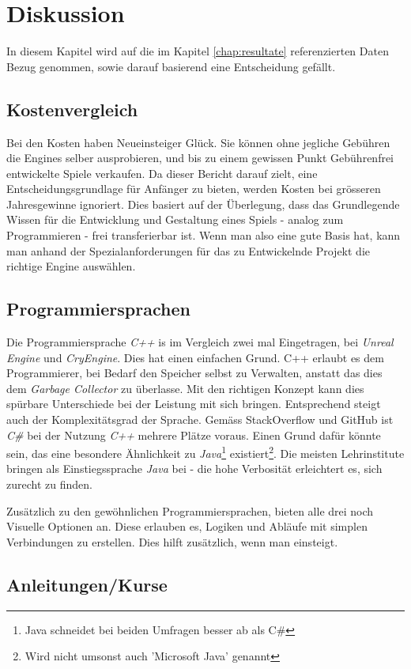 \chapter{Diskussion}

In diesem Kapitel wird auf die im Kapitel \ref{chap:resultate} referenzierten Daten Bezug genommen, sowie darauf basierend eine Entscheidung gefällt.

\section{Kostenvergleich}

Bei den Kosten haben Neueinsteiger Glück. Sie können ohne jegliche Gebühren die Engines selber ausprobieren, und bis zu einem gewissen Punkt Gebührenfrei entwickelte Spiele verkaufen. Da dieser Bericht darauf zielt, eine Entscheidungsgrundlage für Anfänger zu bieten, werden Kosten bei grösseren Jahresgewinne ignoriert. Dies basiert auf der Überlegung, dass das Grundlegende Wissen für die Entwicklung und Gestaltung eines Spiels - analog zum Programmieren - frei transferierbar ist. Wenn man also eine gute Basis hat, kann man anhand der Spezialanforderungen für das zu Entwickelnde Projekt die richtige Engine auswählen.

\section{Programmiersprachen}

Die Programmiersprache \emph{C++} is im Vergleich zwei mal Eingetragen, bei \emph{Unreal Engine} und \emph{CryEngine}. Dies hat einen einfachen Grund. C++ erlaubt es dem Programmierer, bei Bedarf den Speicher selbst zu Verwalten, anstatt das dies dem \emph{Garbage Collector} zu überlasse. Mit den richtigen Konzept kann dies spürbare Unterschiede bei der Leistung mit sich bringen. Entsprechend steigt auch der Komplexitätsgrad der Sprache. Gemäss StackOverflow\cite{stackoverflow_stack_2020} und GitHub\cite{github_state_2020} ist \emph{C\#} bei der Nutzung \emph{C++} mehrere Plätze voraus. Einen Grund dafür könnte sein, das eine besondere Ähnlichkeit zu \emph{Java}\footnote{Java schneidet bei beiden Umfragen besser ab als C\#} existiert\footnote{Wird nicht umsonst auch 'Microsoft Java' genannt}. Die meisten Lehrinstitute bringen als Einstiegssprache \emph{Java} bei - die hohe Verbosität erleichtert es, sich zurecht zu finden.

\par Zusätzlich zu den gewöhnlichen Programmiersprachen, bieten alle drei noch Visuelle Optionen an. Diese erlauben es, Logiken und Abläufe mit simplen Verbindungen zu erstellen. Dies hilft zusätzlich, wenn man einsteigt. 

\section{Anleitungen/Kurse}
